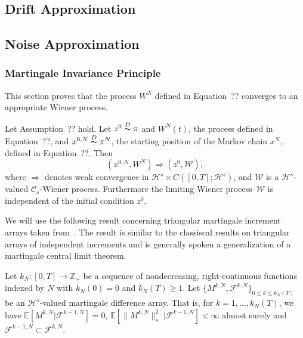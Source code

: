 \subsection{Drift Approximation}

\subsection{Noise Approximation}
 
\subsubsection{Martingale Invariance Principle}
\label{Martingale invariance principle}

This section proves that the process $ W^{N} $ defined in Equation~?? converges to an appropriate Wiener process.

\begin{proposition}
 \label{Invariance principle}
 Let Assumption~?? hold. Let $ z^0 \stackrel{D}{\thicksim} \pi $ and $ W^{N}(t) $, the process defined in Equation~??, and $ x^{0,N} \stackrel{D}{\thicksim} \pi^{N} $, the starting position of the Markov chain $ x^{N} $, defined in Equation~??. Then
 \begin{equation}
  (x^{0,N}, W^{N}) \Longrightarrow (z^0, \mathcal{W}),
 \end{equation}
 where $ \Longrightarrow $ denotes weak convergence in $ \mathcal{H}^s \times C \left( [0,T]; \mathcal{H}^s \right) $, and $ \mathcal{W}$ is a $ \mathcal{H}^s $-valued  $ \mathcal{C}_s $-Wiener process. Furthermore the limiting Wiener process~$ \mathcal{W} $ is independent of the initial condition $ z^0 $.
 
\end{proposition}



We will use the following result concerning triangular martingale increment arrays taken from~\autocite{Berger1986}. The result is similar to the classiscal results on triangular arrays of independent increments and is generally spoken a generalization of a martingale central limit theorem.

Let $ k_{N}: [0,T] \to \mathbb{Z}_{+} $ be a sequence of nondecreasing, right-continuous functions indexed by $ N $ with $ k_{N}(0) = 0 $ and  $k_{N} (T) \geq 1 $. Let $ \{ M^{k,N}, \mathcal{F}^{k,N}  \}_{0 \leq k \leq k_{N}(T)} $ be an $ \mathcal{H}^s $-valued martingale difference array. That is, for $ k = 1,\dots , k_{N}(T) $, we have
$  \mathbb{E} \left[  M^{k,N} | \mathcal{F}^{k-1,N} \right] =  0 $,  $  \mathbb{E} \left[ \| M^{k,N} \|_{s}^{2} \; | \mathcal{F}^{k-1,N} \right] <  \infty $ almost surely
and $ \mathcal{F}^{k-1,N} \subset \mathcal{F}^{k,N} $.

